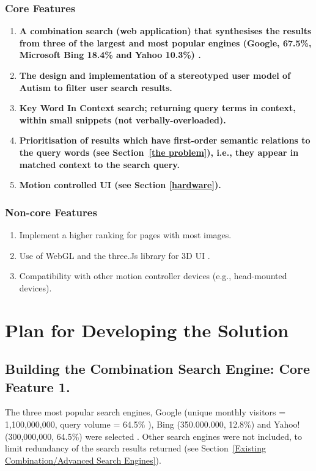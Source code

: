 \documentclass[a4paper, 10pt]{article}
\begin{document}
\subsubsection{Core Features}\label{core}
\begin{enumerate}
\item  \textbf{A combination search (web application) that synthesises the results from three of the largest and most popular engines (Google, 67.5\%, Microsoft Bing 18.4\% and Yahoo 10.3\%) \cite{adam}.}

\item \textbf{The design and implementation of a stereotyped user model of Autism to filter user search results.}

\item \textbf{Key Word In Context search; returning query terms in context, within small snippets (not verbally-overloaded).}

\item \textbf{Prioritisation of results which have first-order semantic relations to the query words (see Section~\ref{the problem}), i.e., they appear in matched context to the search query.}

\item \textbf{Motion controlled UI (see Section \ref{hardware}).}
\end{enumerate}

\subsubsection{Non-core Features}
\begin{enumerate}

\item Implement a higher ranking for pages with most images. 
\item Use of WebGL and the three.Js library for 3D UI .
\item Compatibility with other motion controller devices (e.g., head-mounted devices).

\end{enumerate}

\section{Plan for Developing the Solution}\label{sol}

\subsection{Building the Combination Search Engine: Core Feature 1.} 
The three most popular search engines, Google (unique monthly visitors = 1,100,000,000, query volume = 64.5\% ), Bing (350.000.000, 12.8\%) and Yahoo! (300,000,000, 64.5\%) were selected \cite{ebiz}\cite{adam}. Other search engines were not included, to limit redundancy of the search results returned (see Section~\ref{Existing Combination/Advanced Search Engines}). 
\end{document}
